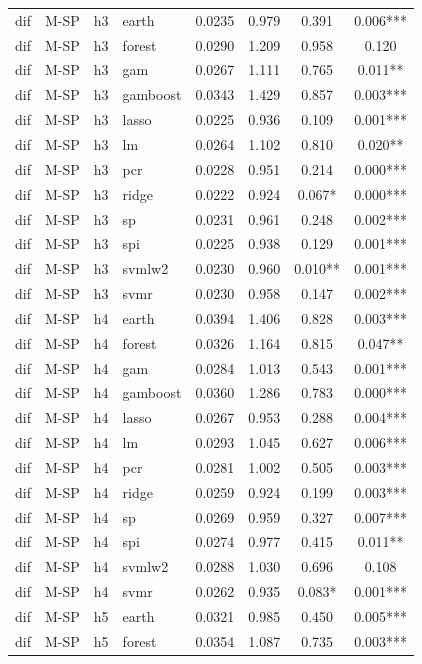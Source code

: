 \begin{ThreePartTable}
\begin{longtable}[t]{llclcccc}
\addlinespace
dif & M-SP & h3 & earth & 0.0235 & 0.979 & 0.391 & 0.006***\\
dif & M-SP & h3 & forest & 0.0290 & 1.209 & 0.958 & 0.120\\
dif & M-SP & h3 & gam & 0.0267 & 1.111 & 0.765 & 0.011**\\
dif & M-SP & h3 & gamboost & 0.0343 & 1.429 & 0.857 & 0.003***\\
dif & M-SP & h3 & lasso & 0.0225 & 0.936 & 0.109 & 0.001***\\
dif & M-SP & h3 & lm & 0.0264 & 1.102 & 0.810 & 0.020**\\
dif & M-SP & h3 & pcr & 0.0228 & 0.951 & 0.214 & 0.000***\\
dif & M-SP & h3 & ridge & 0.0222 & 0.924 & 0.067* & 0.000***\\
dif & M-SP & h3 & sp & 0.0231 & 0.961 & 0.248 & 0.002***\\
dif & M-SP & h3 & spi & 0.0225 & 0.938 & 0.129 & 0.001***\\
dif & M-SP & h3 & svmlw2 & 0.0230 & 0.960 & 0.010** & 0.001***\\
dif & M-SP & h3 & svmr & 0.0230 & 0.958 & 0.147 & 0.002***\\
\addlinespace
dif & M-SP & h4 & earth & 0.0394 & 1.406 & 0.828 & 0.003***\\
dif & M-SP & h4 & forest & 0.0326 & 1.164 & 0.815 & 0.047**\\
dif & M-SP & h4 & gam & 0.0284 & 1.013 & 0.543 & 0.001***\\
dif & M-SP & h4 & gamboost & 0.0360 & 1.286 & 0.783 & 0.000***\\
dif & M-SP & h4 & lasso & 0.0267 & 0.953 & 0.288 & 0.004***\\
dif & M-SP & h4 & lm & 0.0293 & 1.045 & 0.627 & 0.006***\\
dif & M-SP & h4 & pcr & 0.0281 & 1.002 & 0.505 & 0.003***\\
dif & M-SP & h4 & ridge & 0.0259 & 0.924 & 0.199 & 0.003***\\
dif & M-SP & h4 & sp & 0.0269 & 0.959 & 0.327 & 0.007***\\
dif & M-SP & h4 & spi & 0.0274 & 0.977 & 0.415 & 0.011**\\
dif & M-SP & h4 & svmlw2 & 0.0288 & 1.030 & 0.696 & 0.108\\
dif & M-SP & h4 & svmr & 0.0262 & 0.935 & 0.083* & 0.001***\\
\addlinespace
dif & M-SP & h5 & earth & 0.0321 & 0.985 & 0.450 & 0.005***\\
dif & M-SP & h5 & forest & 0.0354 & 1.087 & 0.735 & 0.003***\\

\end{longtable}
\end{ThreePartTable}
